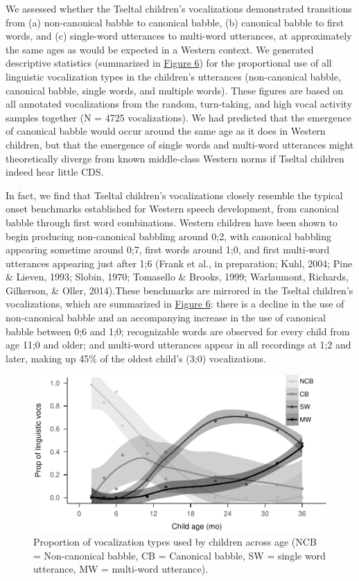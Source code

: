 \documentclass[floatsintext,man]{apa6}
\theoremstyle{definition}
\theoremstyle{definition}
\theoremstyle{definition}
\theoremstyle{remark}
\begin{document}
We assessed whether the Tseltal children's vocalizations demonstrated
transitions from (a) non-canonical babble to canonical babble, (b)
canonical babble to first words, and (c) single-word utterances to
multi-word utterances, at approximately the same ages as would be
expected in a Western context. We generated descriptive statistics
(summarized in \protect\hyperlink{fig6}{Figure 6}) for the proportional
use of all linguistic vocalization types in the children's utterances
(non-canonical babble, canonical babble, single words, and multiple
words). These figures are based on all annotated vocalizations from the
random, turn-taking, and high vocal activity samples together (N = 4725
vocalizations). We had predicted that the emergence of canonical babble
would occur around the same age as it does in Western children, but that
the emergence of single words and multi-word utterances might
theoretically diverge from known middle-class Western norms if Tseltal
children indeed hear little CDS.

In fact, we find that Tseltal children's vocalizations closely resemble
the typical onset benchmarks established for Western speech development,
from canonical babble through first word combinations. Western children
have been shown to begin producing non-canonical babbling around 0;2,
with canonical babbling appearing sometime around 0;7, first words
around 1;0, and first multi-word utterances appearing just after 1;6
(Frank et al., in preparation; Kuhl, 2004; Pine \& Lieven, 1993; Slobin,
1970; Tomasello \& Brooks, 1999; Warlaumont, Richards, Gilkerson, \&
Oller, 2014).These benchmarks are mirrored in the Tseltal children's
vocalizations, which are summarized in \protect\hyperlink{fig6}{Figure
6}: there is a decline in the use of non-canonical babble and an
accompanying increase in the use of canonical babble between 0;6 and
1;0; recognizable words are observed for every child from age 11;0 and
older; and multi-word utterances appear in all recordings at 1;2 and
later, making up 45\% of the oldest child's (3;0) vocalizations.

\begin{figure}
\centering
\includegraphics{Tseltal-CLE_files/figure-latex/fig6-1.pdf}
\caption{\label{fig:fig6}Proportion of vocalization types used by children
across age (NCB = Non-canonical babble, CB = Canonical babble, SW =
single word utterance, MW = multi-word utterance).}
\end{figure}
\end{document}
